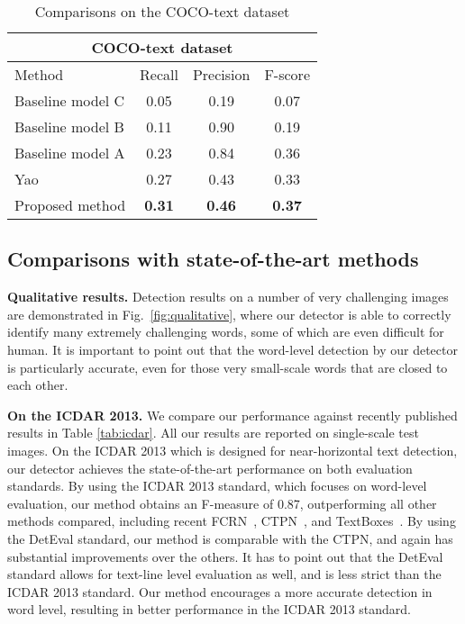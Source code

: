 \documentclass[10pt,twocolumn,letterpaper]{article}
\begin{document}
\begin{table}[h]
\centering
\caption{Comparisons on the COCO-text dataset}
\begin{tabular}{|l|c|c|c|}
\hline
\multicolumn{4}{|c|}{COCO-text dataset} \\ \hline
Method                      & Recall & Precision & F-score \\ \hline
Baseline model C          & 0.05        & 0.19     & 0.07        \\
Baseline model B           & 0.11        & 0.90     & 0.19        \\
Baseline model A                         & 0.23        & 0.84     & 0.36        \\
Yao~\cite{Yao2016}     & 0.27       & 0.43     & 0.33        \\
Proposed method     &  \textbf{0.31}&     \textbf{0.46} &    \textbf{0.37} \\ \hline
\end{tabular}
\label{tab:coco}
\end{table}


\subsection{Comparisons with state-of-the-art methods}
\textbf{Qualitative results.} Detection results on a number of very challenging images are demonstrated in Fig.~\ref{fig:qualitative}, where our detector is able to correctly identify many extremely challenging words, some of which are even difficult for human. It is important to point out that the word-level detection by our detector is particularly accurate, even for those very small-scale words that are closed to each other.

\textbf{On the ICDAR 2013.} We compare our performance against recently published results in Table \ref{tab:icdar}. All our results are reported on single-scale test images. On the ICDAR 2013 which is designed for near-horizontal text detection, our detector achieves the state-of-the-art performance on both evaluation standards. By using the ICDAR 2013 standard, which focuses on word-level evaluation, our method obtains an F-measure of 0.87, outperforming all other methods compared, including recent FCRN~\cite{Gupta2016}, CTPN~\cite{Tian2016}, and TextBoxes~\cite{Liao2017}. By using the DetEval standard, our method is comparable with the CTPN, and again has substantial improvements over the others. It has to point out that the DetEval standard allows for text-line level evaluation as well,  and is less strict than the ICDAR 2013 standard. Our method encourages a more accurate detection in word level, resulting in better performance in the ICDAR 2013 standard.
\end{document}
